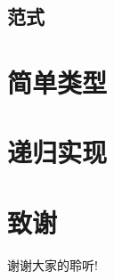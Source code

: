 \documentclass[CJKutf8,compress,hyperref]{beamer}
\begin{document}
\begin{CJK}{UTF8}{song}
\subsection{ 范式}

\section{简单类型} 
\section{递归实现} 

\section{致谢}
\begin{frame}
  \begin{Huge}
    \begin{center}
      谢谢大家的聆听!
    \end{center}
  \end{Huge}
\end{frame}
\end{CJK}
\end{document}
